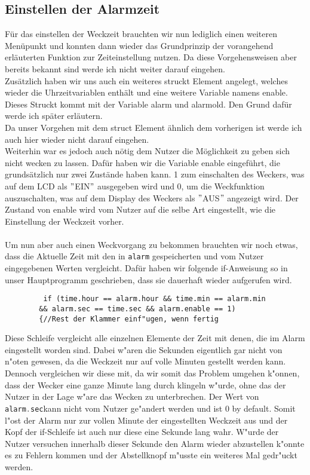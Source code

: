\documentclass[openright,twoside,11pt,a4paper]{scrartcl}
\begin{document}
\begin{flushleft}
	 	\subsection{Einstellen der Alarmzeit}
		 Für das einstellen der Weckzeit brauchten wir nun lediglich einen weiteren Menüpunkt und konnten dann wieder das Grundprinzip der vorangehend erläuterten Funktion zur Zeiteinstellung nutzen. Da diese Vorgehensweisen aber bereits bekannt sind werde ich nicht weiter darauf eingehen.\\
		 Zusätzlich haben wir uns auch ein weiteres struckt Element angelegt, welches wieder die Uhrzeitvariablen enthält und eine weitere Variable namens enable. Dieses Struckt kommt mit der Variable alarm und alarmold. Den Grund dafür werde ich später erläutern. \\
		 Da unser Vorgehen mit dem struct Element ähnlich dem vorherigen ist werde ich auch hier wieder nicht darauf eingehen.\\
	 	Weiterhin war es jedoch auch nötig dem Nutzer die Möglichkeit zu geben sich nicht wecken zu lassen. Dafür haben wir die Variable enable eingeführt, die grundsätzlich nur zwei Zustände haben kann. 1 zum einschalten des Weckers, was auf dem LCD als $"$EIN$"$ ausgegeben wird und 0, um die Weckfunktion auszuschalten, was auf dem Display des Weckers als $"$AUS$"$ angezeigt wird. Der Zustand von enable wird vom Nutzer auf die selbe Art eingestellt, wie die Einstellung der Weckzeit vorher. \\
	 	\ \\
	 	Um nun aber auch einen Weckvorgang zu bekommen brauchten wir noch etwas, dass die Aktuelle Zeit mit den in \lstinline[language=c++]|alarm| gespeicherten und vom Nutzer eingegebenen Werten vergleicht. Dafür haben wir folgende if-Anweisung so in unser Hauptprogramm geschrieben, dass sie dauerhaft wieder aufgerufen wird.
	 	\begin{lstlisting}
	 	 if (time.hour == alarm.hour && time.min == alarm.min
	 	&& alarm.sec == time.sec && alarm.enable == 1)
	 	{//Rest der Klammer einf"ugen, wenn fertig
	 	\end{lstlisting}
	 	Diese Schleife vergleicht alle einzelnen Elemente der Zeit mit denen, die im Alarm eingestellt worden sind. Dabei w"aren die Sekunden eigentlich gar nicht von n"oten gewesen, da die Weckzeit nur auf volle Minuten gestellt werden kann. Dennoch vergleichen wir diese mit, da wir somit das Problem umgehen k"onnen, dass der Wecker eine ganze Minute lang durch klingeln w"urde, ohne das der Nutzer in der Lage w"are das Wecken zu unterbrechen. Der Wert von \lstinline[language=c++]|alarm.sec|kann nicht vom Nutzer ge"andert werden und ist 0 by default. Somit l"ost der Alarm nur zur vollen Minute der eingestellten Weckzeit aus und der Kopf der if-Schleife ist auch nur diese eine Sekunde lang wahr. W"urde der Nutzer versuchen innerhalb dieser Sekunde den Alarm wieder abzustellen k"onnte es zu Fehlern kommen und der Abstellknopf m"usste ein weiteres Mal gedr"uckt werden.

\end{flushleft}
\end{document}
